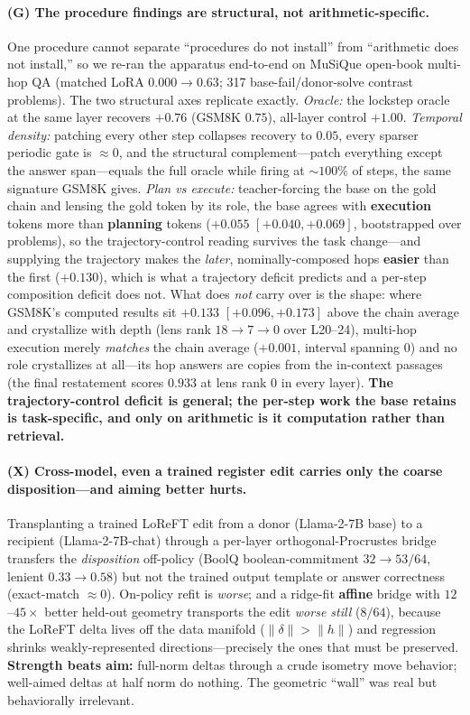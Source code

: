 \documentclass{article}
\begin{document}
\paragraph{(G) The procedure findings are structural, not arithmetic-specific.}
One procedure cannot separate ``procedures do not install'' from ``arithmetic does not install,'' so
we re-ran the apparatus end-to-end on MuSiQue open-book multi-hop QA (matched LoRA $0.000 \to 0.63$;
317 base-fail/donor-solve contrast problems). The two structural axes replicate exactly.
\emph{Oracle:} the lockstep oracle at the same layer recovers $\mathbf{+0.76}$ (GSM8K $0.75$),
all-layer control $+1.00$. \emph{Temporal density:} patching every other step collapses recovery to
$0.05$, every sparser periodic gate is $\approx 0$, and the structural complement---patch everything
except the answer span---equals the full oracle while firing at ${\sim}100\%$ of steps, the same
signature GSM8K gives. \emph{Plan vs execute:} teacher-forcing the base on the gold chain and lensing
the gold token by its role, the base agrees with \textbf{execution} tokens more than \textbf{planning}
tokens ($+0.055$ $[+0.040, +0.069]$, bootstrapped over problems), so the trajectory-control reading
survives the task change---and supplying the trajectory makes the \emph{later}, nominally-composed
hops \textbf{easier} than the first ($+0.130$), which is what a trajectory deficit predicts and a
per-step composition deficit does not. What does \emph{not} carry over is the shape: where GSM8K's
computed results sit $+0.133$ $[+0.096, +0.173]$ above the chain average and crystallize with depth
(lens rank $18 \to 7 \to 0$ over L20--24), multi-hop execution merely \emph{matches} the chain average
($+0.001$, interval spanning 0) and no role crystallizes at all---its hop answers are copies from the
in-context passages (the final restatement scores $0.933$ at lens rank 0 in every layer).
\textbf{The trajectory-control deficit is general; the per-step work the base retains is
task-specific, and only on arithmetic is it computation rather than retrieval.}

\paragraph{(X) Cross-model, even a trained register edit carries only the coarse disposition---and
aiming better hurts.}
Transplanting a trained LoReFT edit from a donor (Llama-2-7B base) to a recipient (Llama-2-7B-chat)
through a per-layer orthogonal-Procrustes bridge transfers the \emph{disposition} off-policy (BoolQ
boolean-commitment $32 \to 53/64$, lenient $0.33 \to 0.58$) but not the trained output template or
answer correctness (exact-match $\approx 0$). On-policy refit is \emph{worse}; and a ridge-fit
\textbf{affine} bridge with $12$--$45\times$ better held-out geometry transports the edit \emph{worse
still} ($8/64$), because the LoReFT delta lives off the data manifold ($\lVert\delta\rVert >
\lVert h \rVert$) and regression shrinks weakly-represented directions---precisely the ones that must
be preserved. \textbf{Strength beats aim:} full-norm deltas through a crude isometry move behavior;
well-aimed deltas at half norm do nothing. The geometric ``wall'' was real but behaviorally irrelevant.
\end{document}

